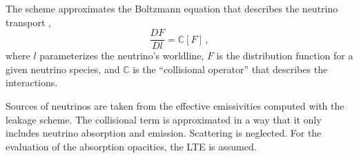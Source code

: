 The scheme approximates the Boltzmann equation that describes 
the neutrino transport \citep{Thorne:1981}, 
\begin{equation*}
\frac{D F}{D l} = \mathbb{C}[F]\, ,
\end{equation*}
where $l$ parameterizes the neutrino's worldline, 
$F$ is the distribution function for a given neutrino species, and $\mathbb{C}$ 
is the ``collisional operator'' that describes the interactions.
%

Sources of neutrinos are taken from the effective emissivities computed 
with the leakage scheme.
The collisional term is approximated in a way that it only includes neutrino 
absorption and emission. Scattering is neglected. 
For the evaluation of the absorption opacities, 
the \ac{LTE} is assumed.
%
%
